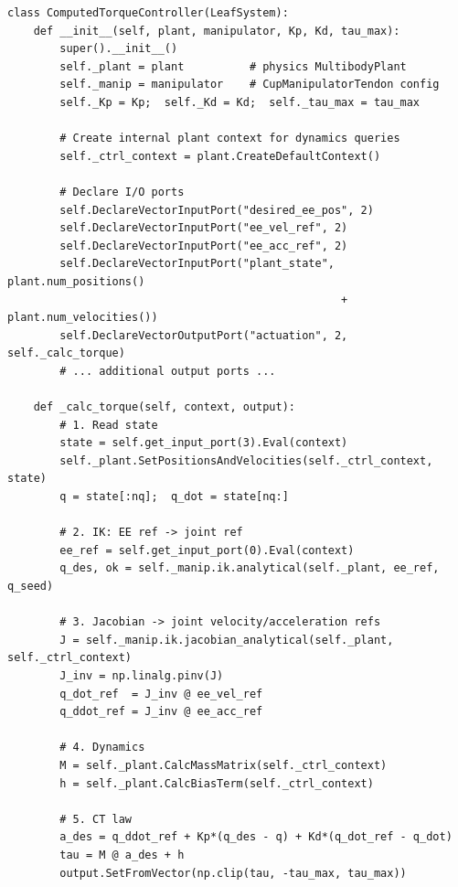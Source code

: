 \documentclass[11pt,a4paper]{article}
\begin{document}
\begin{lstlisting}[caption={Drake LeafSystem-based CT controller (simplified) --- \texttt{robots/cup\_manipulator\_tendon.py}}]
class ComputedTorqueController(LeafSystem):
    def __init__(self, plant, manipulator, Kp, Kd, tau_max):
        super().__init__()
        self._plant = plant          # physics MultibodyPlant
        self._manip = manipulator    # CupManipulatorTendon config
        self._Kp = Kp;  self._Kd = Kd;  self._tau_max = tau_max

        # Create internal plant context for dynamics queries
        self._ctrl_context = plant.CreateDefaultContext()

        # Declare I/O ports
        self.DeclareVectorInputPort("desired_ee_pos", 2)
        self.DeclareVectorInputPort("ee_vel_ref", 2)
        self.DeclareVectorInputPort("ee_acc_ref", 2)
        self.DeclareVectorInputPort("plant_state", plant.num_positions()
                                                   + plant.num_velocities())
        self.DeclareVectorOutputPort("actuation", 2, self._calc_torque)
        # ... additional output ports ...

    def _calc_torque(self, context, output):
        # 1. Read state
        state = self.get_input_port(3).Eval(context)
        self._plant.SetPositionsAndVelocities(self._ctrl_context, state)
        q = state[:nq];  q_dot = state[nq:]

        # 2. IK: EE ref -> joint ref
        ee_ref = self.get_input_port(0).Eval(context)
        q_des, ok = self._manip.ik.analytical(self._plant, ee_ref, q_seed)

        # 3. Jacobian -> joint velocity/acceleration refs
        J = self._manip.ik.jacobian_analytical(self._plant, self._ctrl_context)
        J_inv = np.linalg.pinv(J)
        q_dot_ref  = J_inv @ ee_vel_ref
        q_ddot_ref = J_inv @ ee_acc_ref

        # 4. Dynamics
        M = self._plant.CalcMassMatrix(self._ctrl_context)
        h = self._plant.CalcBiasTerm(self._ctrl_context)

        # 5. CT law
        a_des = q_ddot_ref + Kp*(q_des - q) + Kd*(q_dot_ref - q_dot)
        tau = M @ a_des + h
        output.SetFromVector(np.clip(tau, -tau_max, tau_max))
\end{lstlisting}
\end{document}
